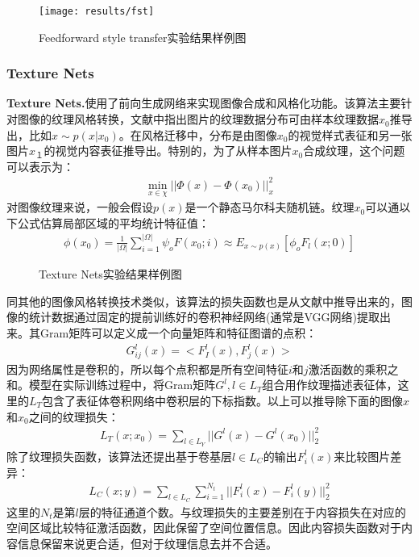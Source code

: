 \begin{figure}[h]
    \centering
    \texttt{[image: results/fst]}
    \caption{Feedforward style transfer实验结果样例图}
    \label{fig:fst}
\end{figure}


\subsubsection{Texture Nets}

\textbf{Texture Nets.}\cite{texture-nets}\quad 使用了前向生成网络来实现图像合成和风格化功能。该算法主要针对图像的纹理风格转换，文献\cite{texture-nets}中指出图片的纹理数据分布可由样本纹理数据$x_0$推导出，比如$x\sim p(x|x_0)$。在风格迁移中，分布是由图像$x_0$的视觉样式表征和另一张图片$x_１$的视觉内容表征推导出。特别的，为了从样本图片$x_0$合成纹理，这个问题可以表示为：
\begin{align}
    \min_{x\in \chi}||\Phi(x)-\Phi(x_0)||_x^2
\end{align}
对图像纹理来说，一般会假设$p(x)$是一个静态马尔科夫随机链。纹理$x_0$可以通以下公式估算局部区域的平均统计特征值：
\begin{align}
    \phi(x_0)=\frac{1}{|\Omega|}\sum_{i=1}^{|\Omega|}\psi_oF(x_0;i)\approx E_{x\sim p(x)}[\phi_oF_l(x;0)]
\end{align}

\begin{figure}[b]
    \centering
    \subfigure[官方实验样例图]{
        \texttt{[image: tn\_o\_1]}
    }
    \caption{Texture Nets实验结果样例图} 
    \label{tn-example}
\end{figure}

同其他的图像风格转换技术类似，该算法的损失函数也是从文献\cite{nst}中推导出来的，图像的统计数据通过固定的提前训练好的卷积神经网络(通常是VGG网络)提取出来。其Gram矩阵可以定义成一个向量矩阵和特征图谱的点积：
\begin{align}
    G_{ij}^l(x)=<F_I^l(x),F_j^l(x)>
\end{align}
因为网络属性是卷积的，所以每个点积都是所有空间特征$i$和$j$激活函数的乘积之和。模型在实际训练过程中，将Gram矩阵$G^l,l\in L_T$组合用作纹理描述表征体，这里的$L_T$包含了表征体卷积网络中卷积层的下标指数。以上可以推导除下面的图像$x$和$x_0$之间的纹理损失：
\begin{align}
    L_T(x;x_0)=\sum_{l\in L_Y}||G^l(x)-G^l(x_0)||_2^2
\end{align}
除了纹理损失函数，该算法还提出基于卷基层$l\in L_C$的输出$F_i^l(x)$来比较图片差异：
\begin{align}
    L_C(x;y)=\sum_{l\in L_C}\sum_{i=1}^{N_t}||F_i^l(x)-F_i^l(y)||_2^2
\end{align}
这里的$N_t$是第$l$层的特征通道个数。与纹理损失的主要差别在于内容损失在对应的空间区域比较特征激活函数，因此保留了空间位置信息。因此内容损失函数对于内容信息保留来说更合适，但对于纹理信息去并不合适。

